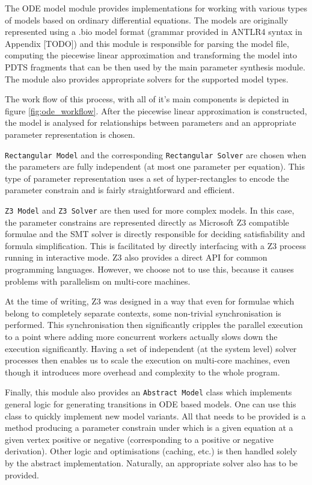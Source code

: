 The ODE model module provides implementations for working with various types of models based on ordinary differential equations. The models are originally represented using a .bio model format (grammar provided in ANTLR4 syntax in Appendix [TODO]) and this module is responsible for parsing the model file, computing the piecewise linear approximation and transforming the model into \ac{PDTS} fragments that can be then used by the main parameter synthesis module. The module also provides appropriate solvers for the supported model types.	

The work flow of this process, with all of it's main components is depicted in figure \ref{fig:ode_workflow}. After the piecewise linear approximation is constructed, the model is analysed for relationships between parameters and an appropriate parameter representation is chosen.

\texttt{Rectangular Model} and the corresponding \texttt{Rectangular Solver} are chosen when the parameters are fully independent (at most one parameter per equation). This type of parameter representation uses a set of hyper-rectangles to encode the parameter constrain and is fairly straightforward and efficient.

\texttt{Z3 Model} and \texttt{Z3 Solver} are then used for more complex models. In this case, the parameter constrains are represented directly as Microsoft Z3 compatible formulae and the SMT solver is directly responsible for deciding satisfiability and formula simplification. This is facilitated by directly interfacing with a Z3 process running in interactive mode. Z3 also provides a direct API for common programming languages. However, we choose not to use this, because it causes problems with parallelism on multi-core machines. 

At the time of writing, Z3 was designed in a way that even for formulae which belong to completely separate contexts, some non-trivial synchronisation is performed. This synchronisation then significantly cripples the parallel execution to a point where adding more concurrent workers actually slows down the execution significantly. Having a set of independent (at the system level) solver processes then enables us to scale the execution on multi-core machines, even though it introduces more overhead and complexity to the whole program.

Finally, this module also provides an \texttt{Abstract Model} class which implements general logic for generating transitions in ODE based models. One can use this class to quickly implement new model variants. All that needs to be provided is a method producing a parameter constrain under which is a given equation at a given vertex positive or negative (corresponding to a positive or negative derivation). Other logic and optimisations (caching, etc.) is then handled solely by the abstract implementation. Naturally, an appropriate solver also has to be provided.

